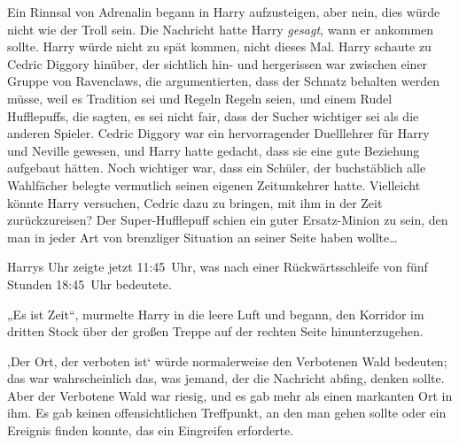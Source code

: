 Ein Rinnsal von Adrenalin begann in Harry aufzusteigen, aber nein, dies würde nicht wie der Troll sein. Die Nachricht hatte Harry \emph{gesagt}, wann er ankommen sollte.
Harry würde nicht zu spät kommen, nicht dieses Mal. Harry schaute zu Cedric Diggory hinüber, der sichtlich hin- und hergerissen war zwischen einer Gruppe von Ravenclaws, die argumentierten, dass der Schnatz behalten werden müsse, weil es Tradition sei und Regeln Regeln seien, und einem Rudel Hufflepuffs, die sagten, es sei nicht fair, dass der Sucher wichtiger sei als die anderen Spieler.
Cedric Diggory war ein hervorragender Duelllehrer für Harry und Neville gewesen, und Harry hatte gedacht, dass sie eine gute Beziehung aufgebaut hätten. Noch wichtiger war, dass ein Schüler, der buchstäblich alle Wahlfächer belegte vermutlich seinen eigenen Zeitumkehrer hatte. Vielleicht könnte Harry versuchen, Cedric dazu zu bringen, mit ihm in der Zeit zurückzureisen? Der Super-Hufflepuff schien ein guter Ersatz-Minion zu sein, den man in jeder Art von brenzliger Situation an seiner Seite haben wollte…


Harrys Uhr zeigte jetzt 11:45~Uhr, was nach einer Rückwärtsschleife von fünf Stunden 18:45~Uhr bedeutete.

„Es ist Zeit“, murmelte Harry in die leere Luft und begann, den Korridor im dritten Stock über der großen Treppe auf der rechten Seite hinunterzugehen.

‚Der Ort, der verboten ist‘ würde normalerweise den Verbotenen Wald bedeuten; das war wahrscheinlich das, was jemand, der die Nachricht abfing, denken sollte.
Aber der Verbotene Wald war riesig, und es gab mehr als einen markanten Ort in ihm. Es gab keinen offensichtlichen Treffpunkt, an den man gehen sollte oder ein Ereignis finden konnte, das ein Eingreifen erforderte.

